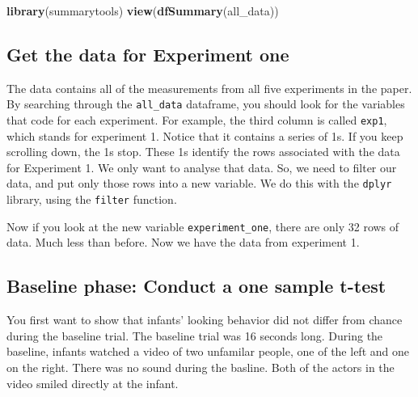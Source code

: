 \documentclass[]{book}
\newenvironment{Shaded}{\begin{snugshade}}{\end{snugshade}}
\newcommand{\KeywordTok}[1]{\textcolor[rgb]{0.13,0.29,0.53}{\textbf{{#1}}}}
\newcommand{\DecValTok}[1]{\textcolor[rgb]{0.00,0.00,0.81}{{#1}}}
\newcommand{\StringTok}[1]{\textcolor[rgb]{0.31,0.60,0.02}{{#1}}}
\newcommand{\NormalTok}[1]{{#1}}
\theoremstyle{definition}
\theoremstyle{definition}
\theoremstyle{definition}
\theoremstyle{remark}
\begin{document}
\begin{Shaded}
\begin{Highlighting}[]
\KeywordTok{library}\NormalTok{(summarytools)}
\KeywordTok{view}\NormalTok{(}\KeywordTok{dfSummary}\NormalTok{(all_data))}
\end{Highlighting}
\end{Shaded}

\subsection{Get the data for Experiment
one}\label{get-the-data-for-experiment-one}

The data contains all of the measurements from all five experiments in
the paper. By searching through the \texttt{all\_data} dataframe, you
should look for the variables that code for each experiment. For
example, the third column is called \texttt{exp1}, which stands for
experiment 1. Notice that it contains a series of 1s. If you keep
scrolling down, the 1s stop. These 1s identify the rows associated with
the data for Experiment 1. We only want to analyse that data. So, we
need to filter our data, and put only those rows into a new variable. We
do this with the \texttt{dplyr} library, using the \texttt{filter}
function.

\begin{Shaded}
\end{Shaded}

Now if you look at the new variable \texttt{experiment\_one}, there are
only 32 rows of data. Much less than before. Now we have the data from
experiment 1.

\subsection{Baseline phase: Conduct a one sample
t-test}\label{baseline-phase-conduct-a-one-sample-t-test}

You first want to show that infants' looking behavior did not differ
from chance during the baseline trial. The baseline trial was 16 seconds
long. During the baseline, infants watched a video of two unfamilar
people, one of the left and one on the right. There was no sound during
the basline. Both of the actors in the video smiled directly at the
infant.
\end{document}
